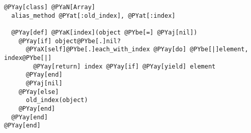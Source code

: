 \begin{Verbatim}[commandchars=@\[\]]
@PYay[class] @PYaN[Array]
  alias_method @PYat[:old_index], @PYat[:index]

  @PYay[def] @PYaK[index](object @PYbe[=] @PYaj[nil])
    @PYay[if] object@PYbe[.]nil?
      @PYaX[self]@PYbe[.]each_with_index @PYay[do] @PYbe[|]element, index@PYbe[|]
        @PYay[return] index @PYay[if] @PYay[yield] element
      @PYay[end]
      @PYaj[nil]
    @PYay[else]
      old_index(object)
    @PYay[end]
  @PYay[end]
@PYay[end]
\end{Verbatim}

